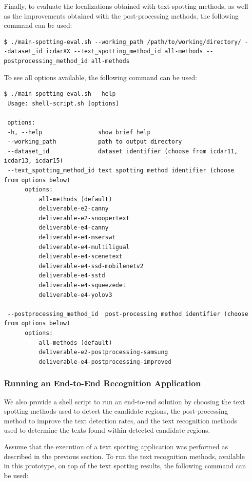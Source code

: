 Finally, to evaluate the localizations obtained with text spotting methods, as well as the improvements obtained with the post-processing methods, the following command can be used:
\begin{lstlisting}[style=fancyterminal]
 $ ./main-spotting-eval.sh --working_path /path/to/working/directory/ --dataset_id icdarXX --text_spotting_method_id all-methods --postprocessing_method_id all-methods
\end{lstlisting}

To see all options available, the following command can be used:
\begin{lstlisting}[style=fancyterminal]
 $ ./main-spotting-eval.sh --help
 Usage: shell-script.sh [options]

 options:
 -h, --help                show brief help
 --working_path            path to output directory
 --dataset_id              dataset identifier (choose from icdar11, icdar13, icdar15)
 --text_spotting_method_id text spotting method identifier (choose from options below)
      options:
          all-methods (default)
          deliverable-e2-canny
          deliverable-e2-snoopertext
          deliverable-e4-canny
          deliverable-e4-mserswt
          deliverable-e4-multiligual
          deliverable-e4-scenetext
          deliverable-e4-ssd-mobilenetv2
          deliverable-e4-sstd
          deliverable-e4-squeezedet
          deliverable-e4-yolov3
          
 --postprocessing_method_id  post-processing method identifier (choose from options below)
      options:
          all-methods (default)
          deliverable-e2-postprocessing-samsung
          deliverable-e4-postprocessing-improved
\end{lstlisting}



\subsubsection{Running an End-to-End Recognition Application}

We also provide a shell script to run an end-to-end solution by choosing the text spotting methods used to detect the candidate regions, the post-processing method to improve the text detection rates, and the text recognition methods used to determine the texts found within detected candidate regions.

Assume that the execution of a text spotting application was performed as described in the previous section. To run the text recognition methods, available in this prototype, on top of the text spotting results, the following command can be used:

